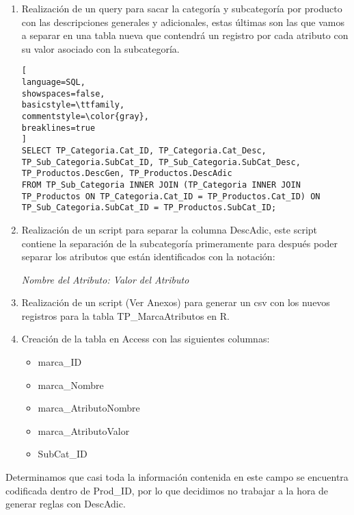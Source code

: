 \documentclass[]{article}
\begin{document}
\begin{enumerate}
	\item Realización de un query para sacar la categoría y subcategoría por producto con las descripciones generales y adicionales, estas últimas son las que vamos a separar en una tabla nueva que contendrá un registro por cada atributo con su valor asociado con la subcategoría.\\
	
\begin{lstlisting}[
language=SQL,
showspaces=false,
basicstyle=\ttfamily,
commentstyle=\color{gray},
breaklines=true
]
SELECT TP_Categoria.Cat_ID, TP_Categoria.Cat_Desc, TP_Sub_Categoria.SubCat_ID, TP_Sub_Categoria.SubCat_Desc, TP_Productos.DescGen, TP_Productos.DescAdic
FROM TP_Sub_Categoria INNER JOIN (TP_Categoria INNER JOIN TP_Productos ON TP_Categoria.Cat_ID = TP_Productos.Cat_ID) ON TP_Sub_Categoria.SubCat_ID = TP_Productos.SubCat_ID;

\end{lstlisting}

	\item Realización de un script para separar la columna DescAdic, este script contiene la separación de la subcategoría primeramente para después poder separar los atributos que están identificados con la notación:\\
	\begin{center}
		\textit{Nombre del Atributo: Valor del Atributo}		
	\end{center}
	
	\item Realización de un script (Ver Anexos) para generar un csv con los nuevos registros para la tabla TP\_MarcaAtributos en R.\\
	
	\item Creación de la tabla en Access con las siguientes columnas:
	\begin{itemize}
		\item marca\_ID
		\item marca\_Nombre
		\item marca\_AtributoNombre
		\item marca\_AtributoValor
		\item SubCat\_ID	
	\end{itemize}	

\end{enumerate}

Determinamos que casi toda la información contenida en este campo se encuentra codificada dentro de Prod\_ID, por lo que decidimos no trabajar a la hora de generar reglas con DescAdic.\\
\end{document}
